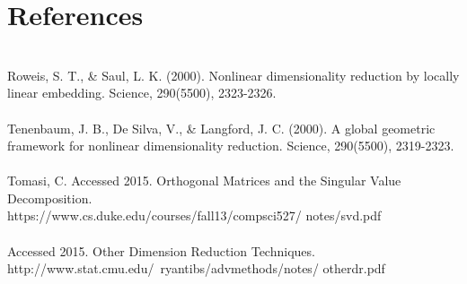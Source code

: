 \documentclass[11pt]{article}
\begin{document}

\section*{References}
\mbox{} \\
Roweis, S. T., \& Saul, L. K. (2000). Nonlinear dimensionality reduction by locally linear embedding. Science, 290(5500), 2323-2326. \\
\mbox{} \\
Tenenbaum, J. B., De Silva, V., \& Langford, J. C. (2000). A global geometric framework for nonlinear dimensionality reduction. Science, 290(5500), 2319-2323. \\
\mbox{} \\
Tomasi, C. Accessed 2015. Orthogonal Matrices and the Singular Value Decomposition.\\
https://www.cs.duke.edu/courses/fall13/compsci527/ notes/svd.pdf \\
\mbox{} \\
Accessed 2015. Other Dimension Reduction Techniques. \\
http://www.stat.cmu.edu/~ryantibs/advmethods/notes/ otherdr.pdf \\
\end{document}
